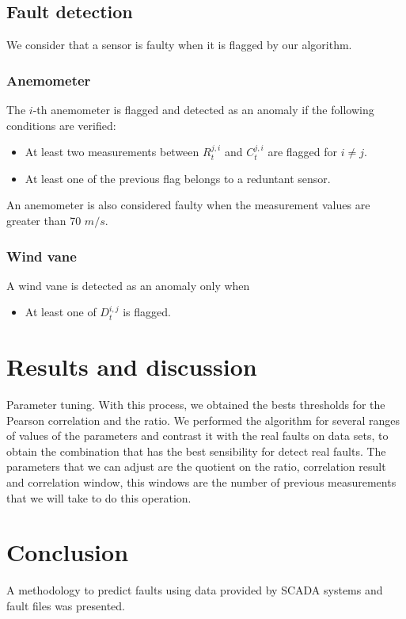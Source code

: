 \documentclass[journal]{IEEEtran}
\begin{document}
\subsection{Fault detection}\label{subsec:faultdetection}

We consider that a sensor is faulty when it is flagged by our algorithm.
\subsubsection{Anemometer}
The $i$-th anemometer is flagged and detected as an anomaly if the following conditions are verified:
\begin{itemize}
	\item At least two measurements between $R_{t}^{j,i}$ and $C_{t}^{j,i}$ are flagged for $i \neq j$.
	\item At least one of the previous flag belongs to a reduntant sensor.
\end{itemize}
An anemometer is also considered faulty when the measurement values are greater than 70 $m/s$.

\subsubsection{Wind vane}
A wind vane is detected as an anomaly only when 
\begin{itemize}
	\item At least one of $D_t^{i,j}$ is flagged.
\end{itemize}

\section{Results and discussion}\label{sec:results}
Parameter tuning.
With this process, we obtained the bests thresholds for the Pearson correlation and the ratio. We performed the algorithm for several ranges of values of the parameters and contrast it with the real faults on data sets, to obtain the combination that has the best sensibility for detect real faults. The parameters that we can adjust are the quotient on the ratio, correlation result and correlation window, this windows are the number of previous measurements that we will take to do this operation.

\section{Conclusion}\label{sec:conclusion}
A methodology to predict faults using data provided by SCADA systems and fault files was presented. 






\end{document}
